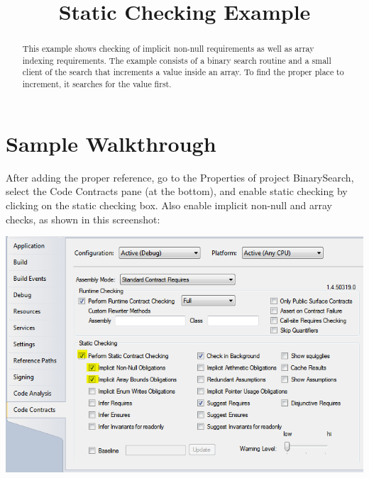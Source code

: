 \documentclass{article}
\title{\ProjectName{} Static Checking Example}
\date{}
\newcommand{\ProjectName}{BinarySearch}
\begin{document}
\maketitle
\begin{abstract}
This example shows checking of implicit non-null requirements as well
as array indexing requirements. The example consists of a binary
search routine and a small client of the search that increments a
value inside an array. To find the proper place to increment, it
searches for the value first.
\end{abstract}



\section{Sample Walkthrough}
\label{sec:start}

After adding the proper reference, go to the Properties of project
\textsf{\ProjectName}, select the Code Contracts pane (at the bottom), and enable static
checking by clicking on the static checking box. Also enable implicit
non-null and array checks, as shown in this screenshot:
\begin{center}
  \includegraphics[width=.8\columnwidth]{ex1.png}
\end{center}
\end{document}
